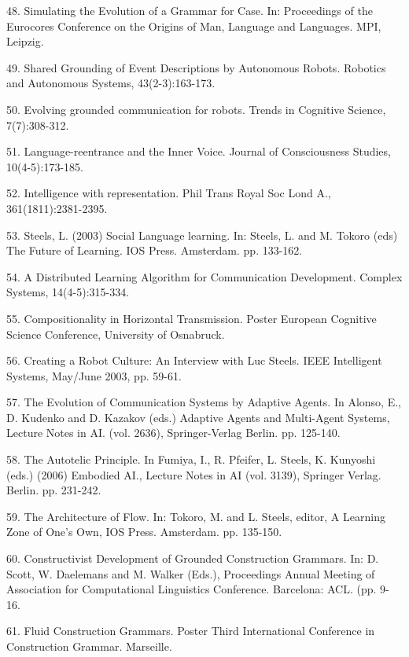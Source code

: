 48. \citet{Steels:02f} Simulating the Evolution of a Grammar for Case. In: Proceedings of the Eurocores Conference 
on the Origins of Man, Language and Languages. MPI, Leipzig.

49. \citet{Steels:03a} Shared Grounding of Event Descriptions by Autonomous Robots. 
Robotics and Autonomous Systems, 43(2-3):163-173.

50. \citet{steels:03b} Evolving grounded communication for robots. Trends in Cognitive Science, 7(7):308-312. 

51. \citet{Steels:03c} Language-reentrance and the Inner Voice. Journal of Consciousness Studies, 10(4-5):173-185. 

52. \citet{Steels:03d} Intelligence with representation. Phil Trans Royal Soc Lond A., 361(1811):2381-2395.

53. \citet{Steels:03e} Steels, L. (2003) Social Language learning. In: Steels, L. and M. Tokoro (eds) The Future of Learning. 
IOS Press. Amsterdam. pp. 133-162. 

54. \citet{dejong:03f} A Distributed Learning Algorithm for Communication Development. 
Complex Systems, 14(4-5):315-334. 

55. \citet{Neubauer:03g}  Compositionality in Horizontal Transmission.  Poster European Cognitive Science Conference, 
University of Osnabruck. 

56. \citet{Manuel:03h} Creating a Robot Culture: An Interview with Luc Steels. IEEE Intelligent Systems, May/June 2003, pp. 59-61. 

57. \citet{steels:04a} The Evolution of Communication Systems by Adaptive Agents. In Alonso, E., D. Kudenko and D. Kazakov (eds.) Adaptive Agents and Multi-Agent Systems, Lecture Notes in AI. (vol. 2636), Springer-Verlag Berlin. pp. 125-140. 

58. \citet{Steels:04b} The Autotelic Principle. In Fumiya, I., R. Pfeifer, L. Steels, K. Kunyoshi (eds.) (2006) Embodied AI., Lecture Notes in AI (vol. 3139), Springer Verlag. Berlin. pp. 231-242. 

59. \citet{Steels:04c} The Architecture of Flow. In: Tokoro, M. and L. Steels, editor, A Learning Zone of One's Own, IOS Press. Amsterdam. 
pp. 135-150.

60. \citet{Steels:04d} Constructivist Development of Grounded Construction Grammars. In: D. Scott, W. Daelemans and M. Walker (Eds.), 
Proceedings Annual Meeting of Association for Computational Linguistics Conference. Barcelona: ACL. (pp. 9-16. 

61. \citet{Steels:04e} Fluid Construction Grammars. Poster Third International Conference in Construction Grammar. Marseille.  

